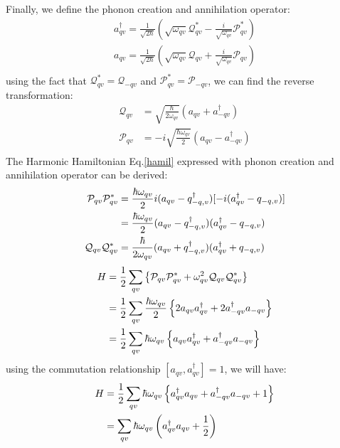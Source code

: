 \documentclass{article}
\begin{document}
Finally, we define the phonon creation and annihilation operator:
\begin{align}
    a^{\dagger}_{qv} = \frac{1}{\sqrt{2\hbar}} \left( \sqrt{\omega_{qv}} \mathcal{Q}^*_{qv} - \frac{i}{\sqrt{\omega_{qv}}}\mathcal{P}^*_{qv} \right) \\
    a_{qv} = \frac{1}{\sqrt{2\hbar}} \left( \sqrt{\omega_{qv}} \mathcal{Q}_{qv} + \frac{i}{\sqrt{\omega_{qv}}}\mathcal{P}_{qv} \right) \\
\end{align}
using the fact that $\mathcal{Q}^*_{qv} = \mathcal{Q}_{-qv}$ and $\mathcal{P}^*_{qv} = \mathcal{P}_{-qv}$, we can find the reverse transformation:
\begin{align}
    \mathcal{Q}_{qv} &= \sqrt{\frac{\hbar}{2\omega_{qv}}} \left( a_{qv} + a^{\dagger}_{-qv} \right) \\
    \mathcal{P}_{qv} &= -i \sqrt{\frac{\hbar\omega_{qv}}{2}} \left( a_{qv} - a^{\dagger}_{-qv} \right) \\
\end{align}
The Harmonic Hamiltonian Eq.\ref{hamil} expressed with phonon creation and annihilation operator can be derived:
\begin{align}
    \mathcal{P}_{qv} \mathcal{P}^*_{qv} &= \frac{\hbar \omega_{qv}}{2} i (a_{qv}-q^{\dagger}_{-q,v})[-i(a^{\dagger}_{qv}-q_{-q,v})] \notag \\
        &= \frac{\hbar \omega_{qv}}{2} (a_{qv}-q^{\dagger}_{-q,v})(a^{\dagger}_{qv}-q_{-q,v}) \\
    \mathcal{Q}_{qv} \mathcal{Q}^*_{qv} &= \frac{\hbar}{2\omega_{qv}} (a_{qv}+q^{\dagger}_{-q,v})(a^{\dagger}_{qv}+q_{-q,v})
\end{align}
\begin{align}
    H &= \frac{1}{2} \sum_{qv} \left\{ \mathcal{P}_{qv} \mathcal{P}^*_{qv} + \omega^2_{qv} \mathcal{Q}_{qv} \mathcal{Q}^*_{qv} \right\} \notag \\
      &= \frac{1}{2} \sum_{qv} \frac{\hbar \omega_{qv}}{2} \left\{ 2a_{qv}a^{\dagger}_{qv} + 2a^{\dagger}_{-qv}a_{-qv} \right\} \notag \\
      &= \frac{1}{2} \sum_{qv} \hbar \omega_{qv} \left\{ a_{qv}a^{\dagger}_{qv} + a^{\dagger}_{-qv}a_{-qv} \right\}
\end{align}
using the commutation relationship $[a_{qv}, a^{\dagger}_{qv}] = 1$, we will have:
\begin{align}
    H &= \frac{1}{2} \sum_{qv} \hbar \omega_{qv} \left\{ a^{\dagger}_{qv}a_{qv} + a^{\dagger}_{-qv}a_{-qv} + 1 \right\} \notag \\
      &= \sum_{qv} \hbar \omega_{qv} \left(a^{\dagger}_{qv}a_{qv} + \frac{1}{2}\right)
\end{align}
\end{document}
